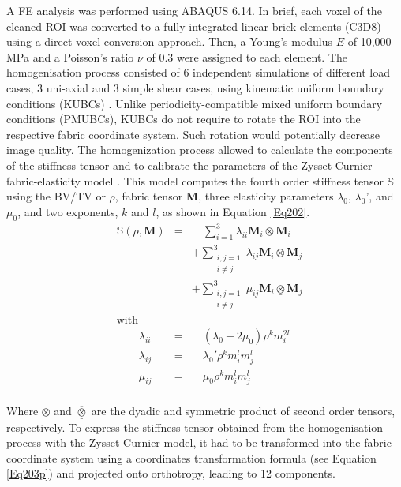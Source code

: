 \documentclass[a4paper,fleqn]{DC_ArtStyle}
\begin{document}
	A \si{\micro}FE analysis was performed using \textsc{ABAQUS 6.14}. In brief, each voxel of the cleaned ROI was converted to a fully integrated linear brick elements (C3D8) using a direct voxel conversion approach. Then, a Young's modulus $E$ of 10,000 MPa and a Poisson's ratio $\nu$ of 0.3 were assigned to each element. The homogenisation process consisted of 6 independent simulations of different load cases, 3 uni-axial and 3 simple shear cases, using kinematic uniform boundary conditions (KUBCs) \cite{Panyasantisuk2015}. Unlike periodicity-compatible mixed uniform boundary conditions (PMUBCs), KUBCs do not require to rotate the ROI into the respective fabric coordinate system. Such rotation would potentially decrease image quality. The homogenization process allowed to calculate the components of the stiffness tensor and to calibrate the parameters of the Zysset-Curnier fabric-elasticity model \cite{Zysset1995}. This model computes the fourth order stiffness tensor $\mathbb{S}$ using the BV/TV or $\rho$, fabric tensor $\mathbf{M}$, three elasticity parameters $\lambda_0$, $\lambda_0$', and $\mu_0$, and two exponents, $k$ and $l$, as shown in Equation \ref{Eq202}.\\
	
	\begin{equation}
	\begin{split}
	&\mathbb{S}(\rho,\mathbf{M}) &=& \quad\sum_{i=1}^{3} \lambda_{ii} \mathbf{M}_i \otimes \mathbf{M}_i \\ &&&+ \sum_{\substack{i,j=1\\i \neq j}}^{3} \lambda_{ij} \mathbf{M}_i \otimes \mathbf{M}_j \\ &&&+ \sum_{\substack{i,j=1\\i \neq j}}^{3} \mu_{ij} \mathbf{M}_i \overline{\underline{\otimes}} \mathbf{M}_j \\
	&\text{with} &\\
	&\qquad\lambda_{ii} &=& \quad(\lambda_0 + 2\mu_0)\rho^k m_i^{2l} \\
	&\qquad\lambda_{ij} &=& \quad\lambda_0' \rho^k m_i^{l} m_j^{l} \\
	&\qquad\mu_{ij} &=& \quad\mu_0 \rho^k m_i^{l} m_j^{l} \\
	\end{split}
	\label{Eq202}
	\end{equation}
	
	Where $\otimes$ and $\overline{\underline{\otimes}}$ are the dyadic and symmetric product of second order tensors, respectively. To express the stiffness tensor obtained from the homogenisation process with the Zysset-Curnier model, it had to be transformed into the fabric coordinate system using a coordinates transformation formula (see Equation \ref{Eq203p}) and projected onto orthotropy, leading to 12 components. 
	
\end{document}
